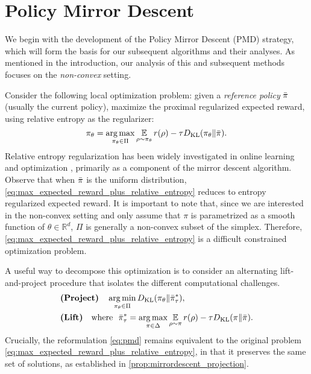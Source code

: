 
\section{Policy Mirror Descent}
\label{subsec:revisitTRPO}

\newcommand{\real}{\mathbb{R}}


We begin with the development of the Policy Mirror Descent (PMD) strategy,
which will form the basis for our subsequent algorithms and their analyses.
As mentioned in the introduction, our analysis of this and subsequent methods
focuses on the \emph{non-convex} setting.

Consider the following local optimization problem:
given a \emph{reference policy} $\bar{\pi}$ (usually the current policy), 
maximize the proximal regularized expected reward,
using relative entropy as the regularizer:
\begin{equation}
\label{eq:max_expected_reward_plus_relative_entropy}
\pi_{\theta} = \operatorname*{arg\,max}\limits_{\pi_\theta \in \Pi} { \operatorname*{\mathbb{E}}\limits_{\rho \sim \pi_\theta}{  r(\rho)  - \tau D_{\mathrm{KL}}(\pi_\theta \| \bar{\pi}) } }.
\end{equation}
Relative entropy regularization has been widely investigated in
online learning and optimization
\citep{nemirovskii1983problem,beck2003mirror},
primarily as a component of the mirror descent algorithm.
Observe that when $\bar{\pi}$ is the uniform distribution,
\cref{eq:max_expected_reward_plus_relative_entropy}
reduces to entropy regularized expected reward.
It is important to note that,
since we are interested in the non-convex setting
and only assume that
$\pi$ is parametrized as a smooth
function of $\theta \in \real^d$,
$\Pi$ is generally a non-convex subset of the simplex.
Therefore, 
\cref{eq:max_expected_reward_plus_relative_entropy}
is a difficult constrained optimization problem.

A useful way to decompose this optimization
is to consider an alternating lift-and-project procedure
that isolates the different computational challenges.
%
{\small
\begin{equation}
\label{eq:pmd}
\begin{aligned}
&\text{\bf (Project)} \quad \operatorname*{arg\,min}\limits_{\pi_\theta \in \Pi}{D_{\mathrm{KL}}( \pi_\theta \| \bar{\pi}_{\tau}^* )}, \\
&\text{\bf (Lift)}  \quad  \text{where}\ \ \bar{\pi}_{\tau}^* =  \operatorname*{arg\,max}\limits_{\pi \in \Delta}{ \operatorname*{\mathbb{E}}\limits_{\rho \sim \pi}{  r(\rho)  - \tau D_{\mathrm{KL}}(\pi \| \bar{\pi}) } }.
\end{aligned}
\end{equation}
}
Crucially, the reformulation \cref{eq:pmd} remains equivalent to the
original problem \cref{eq:max_expected_reward_plus_relative_entropy},
in that it preserves the same set of solutions,
as established in \cref{prop:mirrordescent_projection}.

